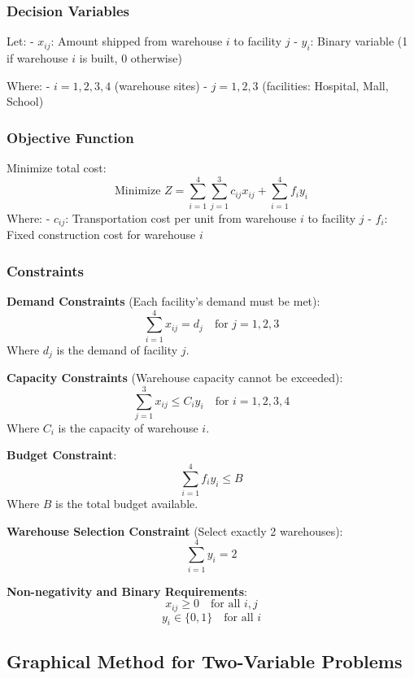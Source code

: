 \documentclass[
  letterpaper,
  DIV=11,
  numbers=noendperiod]{scrreprt}
\begin{document}
\subsubsection{Decision Variables}\label{decision-variables}

Let: - \(x_{ij}\): Amount shipped from warehouse \(i\) to facility \(j\)
- \(y_i\): Binary variable (1 if warehouse \(i\) is built, 0 otherwise)

Where: - \(i = 1, 2, 3, 4\) (warehouse sites) - \(j = 1, 2, 3\)
(facilities: Hospital, Mall, School)

\subsubsection{Objective Function}\label{objective-function}

Minimize total cost: \[
\text{Minimize } Z = \sum_{i=1}^{4} \sum_{j=1}^{3} c_{ij}x_{ij} + \sum_{i=1}^{4} f_i y_i
\] Where: - \(c_{ij}\): Transportation cost per unit from warehouse
\(i\) to facility \(j\) - \(f_i\): Fixed construction cost for warehouse
\(i\)

\subsubsection{Constraints}\label{constraints}

\textbf{Demand Constraints} (Each facility's demand must be met): \[
\sum_{i=1}^{4} x_{ij} = d_j \quad \text{for } j = 1,2,3
\] Where \(d_j\) is the demand of facility \(j\).

\textbf{Capacity Constraints} (Warehouse capacity cannot be exceeded):
\[
\sum_{j=1}^{3} x_{ij} \leq C_i y_i \quad \text{for } i = 1,2,3,4
\] Where \(C_i\) is the capacity of warehouse \(i\).

\textbf{Budget Constraint}: \[
\sum_{i=1}^{4} f_i y_i \leq B
\] Where \(B\) is the total budget available.

\textbf{Warehouse Selection Constraint} (Select exactly 2 warehouses):
\[
\sum_{i=1}^{4} y_i = 2
\]

\textbf{Non-negativity and Binary Requirements}: \[
x_{ij} \geq 0 \quad \text{for all } i,j
\] \[
y_i \in \{0, 1\} \quad \text{for all } i
\]

\subsection{Graphical Method for Two-Variable
Problems}\label{graphical-method-for-two-variable-problems}
\end{document}
